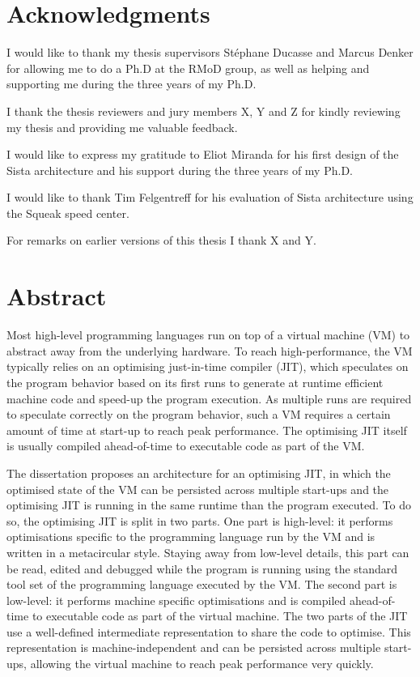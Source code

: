 \documentclass[a4paper,12pt,twoside]{includes/ThesisStyle}
\begin{document}

\dominitoc


\cleardoublepage

\section*{Acknowledgments}

I would like to thank my thesis supervisors St\'ephane Ducasse and Marcus Denker for allowing me to do a Ph.D at the RMoD group, as well as helping and supporting me during the three years of my Ph.D.

I thank the thesis reviewers and jury members X, Y and Z for kindly reviewing my thesis and providing me valuable feedback.

I would like to express my gratitude to Eliot Miranda for his first design of the Sista architecture and his support during the three years of my Ph.D. 

I would like to thank Tim Felgentreff for his evaluation of Sista architecture using the Squeak speed center.

For remarks on earlier versions of this thesis I thank X and Y.

\cleardoublepage

\section*{Abstract}

Most high-level programming languages run on top of a virtual machine (VM) to abstract away from the underlying hardware. To reach high-performance, the VM typically relies on an optimising just-in-time compiler (JIT), which speculates on the program behavior based on its first runs to generate at runtime efficient machine code and speed-up the program execution. As multiple runs are required to speculate correctly on the program behavior, such a VM requires a certain amount of time at start-up to reach peak performance. The optimising JIT itself is usually compiled ahead-of-time to executable code as part of the VM.

The dissertation proposes an architecture for an optimising JIT, in which the optimised state of the VM can be persisted across multiple start-ups and the optimising JIT is running in the same runtime than the program executed. To do so, the optimising JIT is split in two parts. One part is high-level: it performs optimisations specific to the programming language run by the VM and is written in a metacircular style. Staying away from low-level details, this part can be read, edited and debugged while the program is running using the standard tool set of the programming language executed by the VM. The second part is low-level: it performs machine specific optimisations and is compiled ahead-of-time to executable code as part of the virtual machine. The two parts of the JIT use a well-defined intermediate representation to share the code to optimise. This representation is machine-independent and can be persisted across multiple start-ups, allowing the virtual machine to reach peak performance very quickly.
\end{document}
